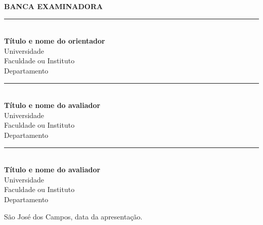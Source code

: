 %


\begin{folhadeaprovacao}

\begin{center}
{\large{\textbf{BANCA EXAMINADORA}}}

\vspace{3.5cm}


\begin{normalsize}

\rule{12cm}{1pt} \\
\textbf{Título e nome do orientador} \\
Universidade \\
Faculdade ou Instituto \\
Departamento \\

\vspace{4cm}

\rule{12cm}{1pt} \\
\textbf{Título e nome do avaliador} \\
Universidade \\
Faculdade ou Instituto \\
Departamento \\

\vspace{4cm}

\rule{12cm}{1pt} \\
\textbf{Título e nome do avaliador} \\
Universidade \\
Faculdade ou Instituto \\
Departamento \\

\end{normalsize}

\end{center}  

\vspace{2cm}

\begin{flushright}
São José dos Campos, data da apresentação.
\end{flushright}
  
\end{folhadeaprovacao}
